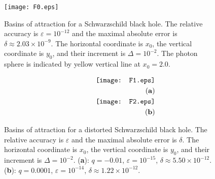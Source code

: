 \documentclass[twocolumn,showpacs,preprintnumbers,amsmath,amssymb,floatfix,nofootinbib]{revtex4-1}
\newcommand{\ba}{\begin{eqnarray}}
\newcommand{\ea}{\end{eqnarray}}
\newcommand{\non}{\nonumber}
\begin{document}
\begin{figure}[ht]
\begin{center}
\hspace{0cm}
\texttt{[image: F0.eps]}
\caption{Basins of attraction for a Schwarzschild black hole. The relative accuracy is $\varepsilon=10^{-12}$ and the maximal absolute error is $\delta\approx2.03\times10^{-9}$. The horizontal coordinate is $x_0$, the vertical coordinate is $y_0$, and their increment is $\Delta=10^{-2}$. The photon sphere is indicated by yellow vertical line at $x_0=2.0$.} \label{fig6}
\end{center}
\end{figure}
\begin{figure}[ht]
\begin{center}
\hspace{0cm}
\ba
&&\texttt{[image: F1.eps]}\non\\
&&\hspace{3.5cm}({\bf a})\non\\
&&\texttt{[image: F2.eps]}\non\\
&&\hspace{3.5cm}({\bf b})\non
\ea
\caption{Basins of attraction for a distorted Schwarzschild black hole. The relative accuracy is $\varepsilon$ and the maximal absolute error is $\delta$. The horizontal coordinate is $x_0$, the vertical coordinate is $y_0$, and their increment is $\Delta=10^{-2}$.   ({\bf a}): $q=-0.01$, $\varepsilon=10^{-15}$, $\delta\approx5.50\times10^{-12}$. ({\bf b}): $q=0.0001$, $\varepsilon=10^{-14}$, $\delta\approx1.22\times10^{-12}$.}\label{fig7}
\end{center}
\end{figure}
\end{document}

